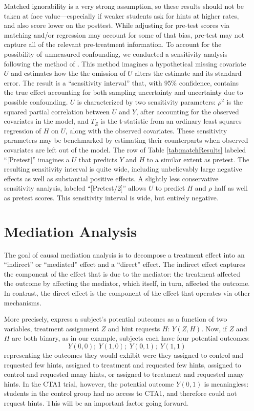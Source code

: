 \documentclass{article}\usepackage[]{graphicx}\usepackage[]{color}
\begin{document}
Matched ignorability is a very strong assumption, so these results
should not be taken at face value---especially if weaker students ask for hints at
higher rates, and also score lower on the posttest.
While adjusting for pre-test scores via matching and/or regression
may account for some of that bias, pre-test may not capture all of the
relevant pre-treatment information.
To account for the possibility of unmeasured confounding, we conducted
a sensitivity analysis following the method of \citet{hhh}.
This method imagines a hypothetical missing covariate $U$ and estimates
how the the omission of $U$ alters the estimate
and its standard error.
The result is a ``sensitivity interval'' \citep[c.f.][]{rosenbaum2002observational} that,
with 95\% confidence, contains the true effect accounting for both
sampling uncertainty and uncertainty due to possible confounding.
$U$ is characterized by two sensitivity parameters:
$\rho^2$ is the squared partial correlation between $U$ and $Y$, after
accounting for the observed covariates in the model, and $T_Z$ is the
t-statistic from an ordinary least squares regression of $H$ on $U$, along with the observed covariates.
These sensitivity parameters may be benchmarked by estimating their
counterparts when observed covariates are left out of the model.
The row of Table \ref{tab:matchResults} labeled ``[Pretest]''
imagines a $U$ that predicts $Y$ and $H$ to a similar extent as
pretest.
The resulting sensitivity interval is quite wide, including
unbelievably large negative effects as well as substantial positive
effects.
A slightly less conservative sensitivity analysis, labeled
``[Pretest/2]'' allows $U$ to
predict $H$ and $\rho$ half as well as pretest scores.
This sensitivity interval is wide, but entirely negative.

\section{Mediation Analysis}\label{sec:mediation}
The goal of causal mediation analysis is to decompose a treatment
effect into an ``indirect'' or ``mediated''
effect and a ``direct'' effect.
The indirect effect captures the component of the effect that is due
to the mediator: the treatment affected the outcome by affecting the
mediator, which itself, in turn, affected the outcome.
In contrast, the direct effect is the component of the effect that
operates via other mechanisms.

More precisely, express a subject's potential outcomes as a function
of two variables, treatment assignment $Z$ and hint requests $H$:
$Y(Z,H)$.
Now, if $Z$ and $H$ are both binary, as in our example, subjects
each have four potential outcomes:
\begin{equation*}
Y(0,0);\;Y(1,0);\;Y(0,1);\;Y(1,1)
\end{equation*}
representing the outcomes they would exhibit were they assigned to
control and requested few hints, assigned to
treatment and requested few hints, assigned to control and requested
many hints, or assigned to treatment and requested many hints.
In the CTA1 trial, however, the potential outcome $Y(0,1)$ is
meaningless: students in the control group had no access to CTA1, and
therefore could not request hints.
This will be an important factor going forward.
\end{document}
